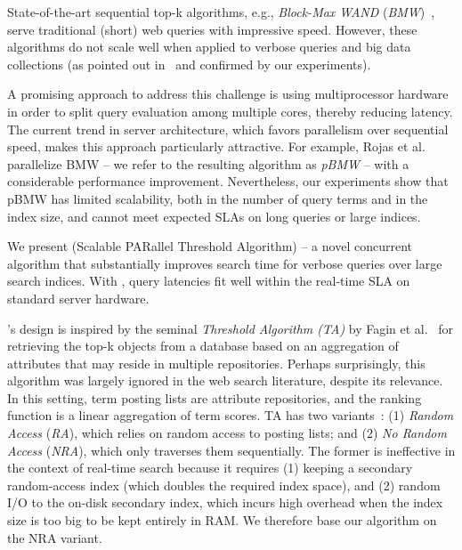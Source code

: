 State-of-the-art sequential top-k  algorithms, 
e.g., \emph{Block-Max WAND} ({\em BMW})~\cite{Ding:2011}, serve traditional (short) web queries with impressive speed. 
However, these algorithms do not scale well when applied to verbose queries
and big data collections (as pointed out in~\cite{Bortnikov:2017} and confirmed by our experiments). 

A promising approach to address this challenge is using multiprocessor hardware in order to split query evaluation among multiple cores, thereby reducing latency. The current trend in server architecture, which favors parallelism over sequential speed, makes this approach particularly attractive. 
For example, Rojas et al.~\cite{rojas2013efficient} parallelize BMW -- we refer 
to the resulting algorithm as \emph{pBMW} -- with a considerable performance improvement.
Nevertheless, our experiments show that pBMW has limited scalability, both in the number of query terms and in the index size,
and cannot meet expected SLAs on long queries or large indices. 

We present \emph{\alg} (Scalable PARallel Threshold Algorithm) -- a novel 
concurrent algorithm that substantially improves search time for verbose queries over large search indices. With \alg, 
 query latencies fit well within the real-time SLA on standard  server hardware. 

\alg's design is inspired by the seminal \emph{Threshold Algorithm (TA)} by Fagin et al.~\cite{Fagin:2003} for retrieving the top-k objects from a database based on an aggregation of attributes that may reside in multiple repositories. Perhaps surprisingly, this algorithm was largely ignored in the web search literature, despite its relevance. 
In this setting, term posting lists are attribute repositories, and the ranking function is a linear aggregation of term scores. TA has two variants~\cite{Fagin:2003}: (1) \emph{Random Access} ({\em RA}), which  
 relies on random access to  posting lists; 
and (2) \emph{No Random Access} ({\em NRA}), which 
 only traverses them sequentially. The former is ineffective in the context of real-time search 
because it requires (1) keeping a secondary random-access index (which doubles the required index space), 
and (2) random I/O to the on-disk secondary index, which incurs high overhead when the index size is too big to be 
kept entirely in RAM. We therefore base our algorithm on the NRA variant. 



